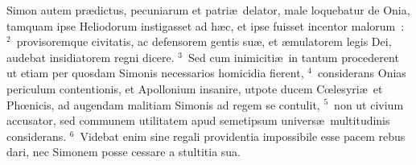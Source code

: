 \lettrine[lines=3,image=true,loversize=0.05,lraise=-0.03]{S}{}imon autem pr\ae dictus, pecuniarum et patri\ae\ delator, male loquebatur de Onia, tamquam ipse Heliodorum instigasset ad h\ae c, et ipse fuisset incentor malorum~:
${}^{2}$~provisoremque civitatis, ac defensorem gentis su\ae , et \ae mulatorem legis Dei, audebat insidiatorem regni dicere.
${}^{3}$~Sed cum inimiciti\ae\ in tantum procederent ut etiam per quosdam Simonis necessarios homicidia fierent,
${}^{4}$~considerans Onias periculum contentionis, et Apollonium insanire, utpote ducem Cœlesyri\ae\ et Phœnicis, ad augendam malitiam Simonis ad regem se contulit,
${}^{5}$~non ut civium accusator, sed communem utilitatem apud semetipsum univers\ae\ multitudinis considerans.
${}^{6}$~Videbat enim sine regali providentia impossibile esse pacem rebus dari, nec Simonem posse cessare a stultitia sua.


